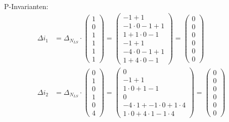 \documentclass[12pt, paper=a4]{article}
\begin{document}
P-Invarianten:\\
\begin{align*}
\Delta i_1 &= \Delta_{N_{LS}} \cdot \begin{pmatrix}1 \\ 0 \\ 1 \\ 1 \\ 1 \\ 1\end{pmatrix} = 
\begin{pmatrix}-1+1 \\ -1 \cdot 0-1+1\\ 1+1 \cdot 0-1 \\ -1+1 \\ -4 \cdot 0-1+1 \\ 1+4 \cdot 0-1\end{pmatrix} = 
\begin{pmatrix}0 \\ 0 \\ 0 \\ 0 \\ 0 \\ 0\end{pmatrix}
\\
\Delta i_2 &= \Delta_{N_{LS}} \cdot \begin{pmatrix}0 \\ 1 \\ 0 \\ 1 \\ 0 \\ 4\end{pmatrix} = 
\begin{pmatrix}0 \\ -1+1 \\ 1 \cdot 0+1-1 \\ 0 \\ -4 \cdot 1+-1 \cdot 0+1 \cdot 4 \\ 1 \cdot 0+4 \cdot 1-1 \cdot 4\end{pmatrix} =
\begin{pmatrix}0 \\ 0 \\ 0 \\ 0 \\ 0 \\ 0\end{pmatrix}
\end{align*}
\end{document}
